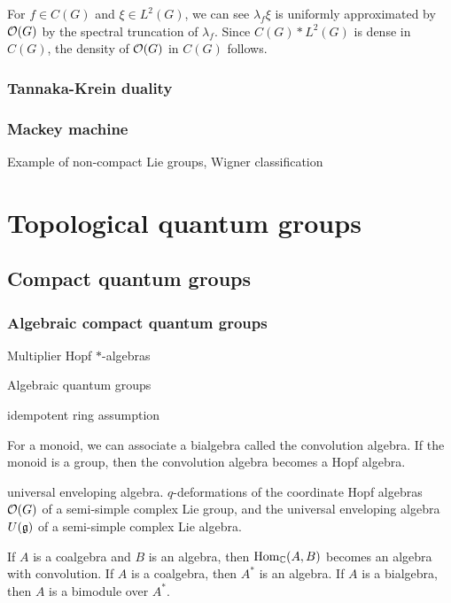 \documentclass{../../large}
\begin{document}
For $f\in C(G)$ and $\xi\in L^2(G)$, we can see $\lambda_f\xi$ is uniformly approximated by $\mathcal{O}(G)$ by the spectral truncation of $\lambda_f$.
Since $C(G)*L^2(G)$ is dense in $C(G)$, the density of $\mathcal{O}(G)$ in $C(G)$ follows.

\section{Tannaka-Krein duality}
\section{Mackey machine}
Example of non-compact Lie groups,
Wigner classification

















\part{Topological quantum groups}


\chapter{Compact quantum groups}

\section{Algebraic compact quantum groups}

Multiplier Hopf $*$-algebras

Algebraic quantum groups

idempotent ring assumption



For a monoid, we can associate a bialgebra called the convolution algebra.
If the monoid is a group, then the convolution algebra becomes a Hopf algebra.

universal enveloping algebra.
$q$-deformations of the coordinate Hopf algebras $\mathcal{O}(G)$ of a semi-simple complex Lie group, and the universal enveloping algebra $U(\mathfrak{g})$ of a semi-simple complex Lie algebra.

If $A$ is a coalgebra and $B$ is an algebra, then $\operatorname{Hom}_{\mathbb{C}}(A,B)$ becomes an algebra with convolution.
If $A$ is a coalgebra, then $A^*$ is an algebra.
If $A$ is a bialgebra, then $A$ is a bimodule over $A^*$.
\end{document}
